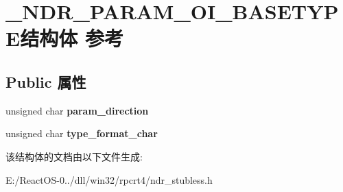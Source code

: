 \hypertarget{struct___n_d_r___p_a_r_a_m___o_i___b_a_s_e_t_y_p_e}{}\section{\+\_\+\+N\+D\+R\+\_\+\+P\+A\+R\+A\+M\+\_\+\+O\+I\+\_\+\+B\+A\+S\+E\+T\+Y\+P\+E结构体 参考}
\label{struct___n_d_r___p_a_r_a_m___o_i___b_a_s_e_t_y_p_e}
\subsection*{Public 属性}
\begin{DoxyCompactItemize}
\item 
\mbox{\label{struct___n_d_r___p_a_r_a_m___o_i___b_a_s_e_t_y_p_e_a31545e79f7dc5c9b3acda95026f7db00}} 
unsigned char {\bfseries param\+\_\+direction}
\item 
\mbox{\label{struct___n_d_r___p_a_r_a_m___o_i___b_a_s_e_t_y_p_e_a2b4c151940314c9dda0b43729f3396e5}} 
unsigned char {\bfseries type\+\_\+format\+\_\+char}
\end{DoxyCompactItemize}


该结构体的文档由以下文件生成\+:\begin{DoxyCompactItemize}
\item 
E\+:/\+React\+O\+S-\/0../dll/win32/rpcrt4/ndr\+\_\+stubless.\+h\end{DoxyCompactItemize}
